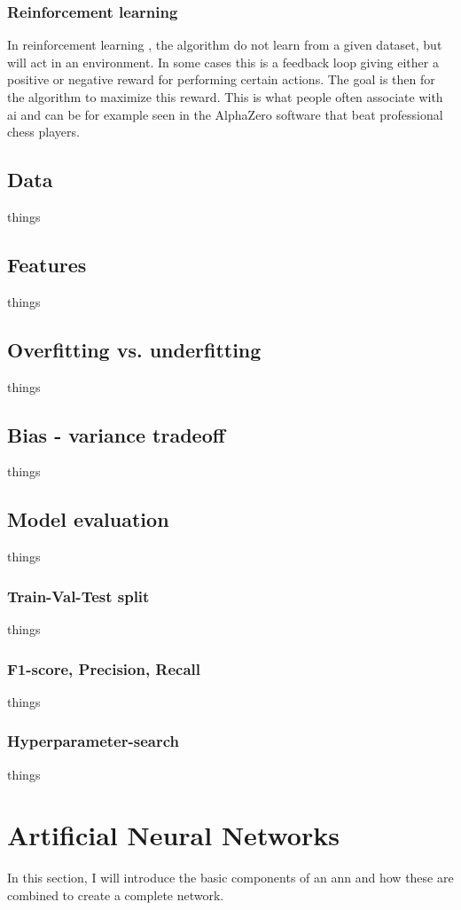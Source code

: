         \subsubsection{Reinforcement learning}
            In reinforcement learning \cite{Goodfellow-et-al-2016_E}, the algorithm do not learn from a given dataset, but will act in an environment. In some cases this is a feedback loop giving either a positive or negative reward for performing certain actions. The goal is then for the algorithm to maximize this reward. This is what people often associate with \gls{ai} and can be for example seen in the AlphaZero software that beat professional chess players\cite{silver2017mastering}.
    
    \subsection{Data}
        things
    \subsection{Features}
        things
    \subsection{Overfitting vs. underfitting}
        things
    \subsection{Bias - variance tradeoff}
        things
    \subsection{Model evaluation}
        things
    \subsubsection{Train-Val-Test split}
        things
    \subsubsection{F1-score, Precision, Recall} \label{f1_score}
        things
    \subsubsection{Hyperparameter-search}
        things

\section{Artificial Neural Networks} \label{neural networks}
    In this section, I will introduce the basic components of an \gls{ann} and how these are combined to create a complete network.

